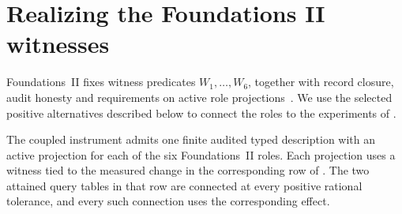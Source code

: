 \section{Realizing the Foundations II witnesses}\label{sec:witness-bridge}

Foundations~II fixes witness predicates \(W_1,\ldots,W_6\), together
with record closure, audit honesty and requirements on active role
projections~\citep[Sections 2, 4 and 5]{foundations2v3}. We use the
selected positive alternatives described below to connect the roles
to the experiments of .

\begin{proposition}\label{prop:witness-realization}
The coupled instrument admits one finite audited typed description
with an active projection for each of the six Foundations~II roles.
Each projection uses a witness tied to the measured change in the
corresponding row of . The two attained query
tables in that row are connected at every positive rational
tolerance, and every such connection uses the corresponding effect.
\end{proposition}

